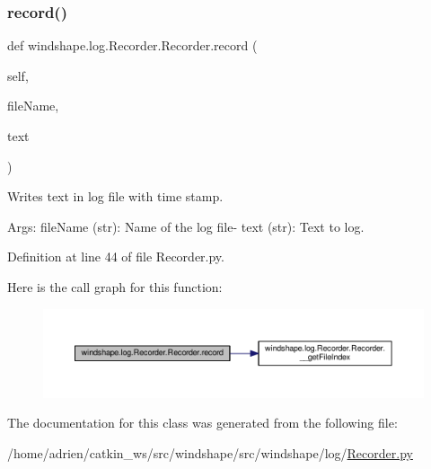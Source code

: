 \subsubsection{\texorpdfstring{record()}{record()}}
{\footnotesize\ttfamily def windshape.\+log.\+Recorder.\+Recorder.\+record (\begin{DoxyParamCaption}\item[{}]{self,  }\item[{}]{file\+Name,  }\item[{}]{text }\end{DoxyParamCaption})}

\begin{DoxyVerb}Writes text in log file with time stamp.

Args:
    fileName (str): Name of the log file-
    text (str): Text to log.
\end{DoxyVerb}
 

Definition at line 44 of file Recorder.\+py.

Here is the call graph for this function\+:\nopagebreak
\begin{figure}[H]
\begin{center}
\leavevmode
\includegraphics[width=350pt]{classwindshape_1_1log_1_1_recorder_1_1_recorder_a84bfc08734cfcbe14b0cb1daa5a46690_cgraph}
\end{center}
\end{figure}


The documentation for this class was generated from the following file\+:\begin{DoxyCompactItemize}
\item 
/home/adrien/catkin\+\_\+ws/src/windshape/src/windshape/log/\mbox{\hyperlink{_recorder_8py}{Recorder.\+py}}\end{DoxyCompactItemize}
